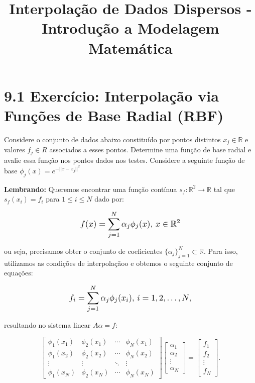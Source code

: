 \documentclass{article}
\title{Interpolação de Dados Dispersos - Introdução a Modelagem Matemática}
\author{}
\date{}
\begin{document}
\maketitle

\section*{9.1 Exercício: Interpolação via Funções de Base Radial (RBF)}

Considere o conjunto de dados abaixo constituído por pontos distintos $x_j \in \mathbb{R}$ e valores $f_j \in R$ associados a esses pontos. Determine uma função de base radial e avalie essa função nos pontos dados nos testes. Considere a seguinte função de base $\phi_{j}(x) = e^{-||x-x_j||^2}$

\textbf{Lembrando:} Queremos encontrar uma função contínua $s_f : \mathbb{R}^2 \rightarrow \mathbb{R}$ tal que $s_{f}(x_i) = f_i$ para $1 \leq i \leq N$ dado por:

\begin{center}
\[
\scalebox{1.2}{$\displaystyle f(x) = \sum_{j=1}^{N} \alpha_j \phi_j(x), \, x \in \mathbb{R}^2$}
\]
\end{center}

ou seja, precisamos obter o conjunto de coeficientes $\{\alpha_j\}_{j=1}^N \subset \mathbb{R}$. Para isso, utilizamos as condições de interpolaçãoo e obtemos o seguinte conjunto de equações:

\begin{center}
\[
\scalebox{1.2}{$\displaystyle f_i = \sum_{j=1}^{N} \alpha_j \phi_j(x_i), \, i = 1, 2, \ldots, N,$}
\]
\end{center}

resultando no sistema linear $A\alpha = f$:

\[
\begin{bmatrix}
\phi_1(x_1) & \phi_2(x_1) & \cdots & \phi_N(x_1) \\
\phi_1(x_2) & \phi_2(x_2) & \cdots & \phi_N(x_2) \\
\vdots & \vdots & \ddots & \vdots \\
\phi_1(x_N) & \phi_2(x_N) & \cdots & \phi_N(x_N)
\end{bmatrix}
\begin{bmatrix}
\alpha_1 \\ \alpha_2 \\ \vdots \\ \alpha_N
\end{bmatrix}
=
\begin{bmatrix}
f_1 \\ f_2 \\ \vdots \\ f_N
\end{bmatrix}.
\]
\end{document}
